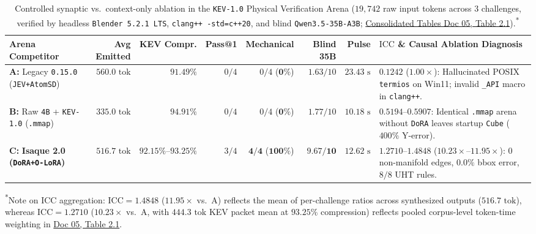 \documentclass[10pt,a4paper]{article}
\begin{document}
\begin{table}[!htbp]
\centering
\caption{Controlled synaptic vs.\ context-only ablation in the \texttt{KEV-1.0} Physical Verification Arena ($19,742$ raw input tokens across $3$ challenges, verified by headless \texttt{Blender 5.2.1 LTS}, \texttt{clang++ -std=c++20}, and blind \texttt{Qwen3.5-35B-A3B}; \href{https://docs.google.com/document/d/1SMqD_TRf6Qi8UwPTFYjKPNvdVlEtpCqr3Ex57x76FsI/edit?usp=drivesdk}{Consolidated Tables Doc 05, Table 2.1}).\textsuperscript{*}}
\label{tab:arena}
\footnotesize
\begin{tabularx}{\linewidth}{@{}lrrrrrrY@{}}
\toprule
\textbf{Arena Competitor} & \textbf{Avg Emitted} & \textbf{KEV Compr.} & \textbf{Pass@1} & \textbf{Mechanical} & \textbf{Blind 35B} & \textbf{Pulse} & \textbf{$\mathrm{ICC}$ \& Causal Ablation Diagnosis} \\
\midrule
\textbf{A:} Legacy \texttt{0.15.0} (\texttt{JEV+AtomSD}) & $560.0\text{ tok}$ & $91.49\%$ & $0/4$ & $0/4$ ($\mathbf{0\%}$) & $1.63 / 10$ & $23.43\text{ s}$ & $\mathbf{0.1242}$ ($1.00\times$): Hallucinated POSIX \texttt{termios} on Win11; invalid \texttt{\_\allowbreak{}API} macro in \texttt{clang++}. \\
\textbf{B:} Raw \texttt{4B} + \texttt{KEV-1.0} (\texttt{.mmap}) & $335.0\text{ tok}$ & $94.91\%$ & $0/4$ & $0/4$ ($\mathbf{0\%}$) & $1.77 / 10$ & $10.18\text{ s}$ & $\mathbf{0.5194\text{--}0.5907}$: Identical \texttt{.mmap} arena without \texttt{DoRA} leaves startup \texttt{Cube} ($400\%$ Y-error). \\
\textbf{C:} \textbf{Isaque 2.0 (\texttt{DoRA+O-LoRA})} & $516.7\text{ tok}$ & $92.15\%\text{--}93.25\%$ & $3/4$ & $\mathbf{4/4}$ ($\mathbf{100\%}$) & $\mathbf{9.67 / 10}$ & $12.62\text{ s}$ & $\mathbf{1.2710\text{--}1.4848}$ ($\mathbf{10.23\times\text{--}11.95\times}$): $0$ non-manifold edges, $0.0\%$ bbox error, $8/8$ UHT rules. \\
\bottomrule
\end{tabularx}
\vspace{2pt}
{\scriptsize \textsuperscript{*}Note on $\mathrm{ICC}$ aggregation: $\mathrm{ICC}=1.4848$ ($11.95\times$ vs.\ A) reflects the mean of per-challenge ratios across synthesized outputs ($516.7\text{ tok}$), whereas $\mathrm{ICC}=1.2710$ ($10.23\times$ vs.\ A, with $444.3\text{ tok}$ KEV packet mean at $93.25\%$ compression) reflects pooled corpus-level token-time weighting in \href{https://docs.google.com/document/d/1SMqD_TRf6Qi8UwPTFYjKPNvdVlEtpCqr3Ex57x76FsI/edit?usp=drivesdk}{Doc 05, Table 2.1}.\par}
\end{table}
\end{document}
